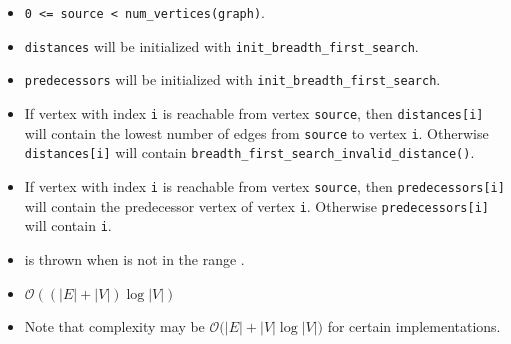 {\small
      
}

\begin{itemdescr}
\preconditions
            \begin{itemize}
                  \item
                        \lstinline{0 <= source < num_vertices(graph)}. 
                  \item
                        \lstinline{distances} will be initialized with \lstinline{init_breadth_first_search}.
                  \item
                        \lstinline{predecessors} will be initialized with \lstinline{init_breadth_first_search}.
            \end{itemize}
      \pnum\effects
            \begin{itemize}
                  \item
                        If vertex with index \lstinline{i} is reachable from vertex \lstinline{source}, then
                        \lstinline{distances[i]} will contain the lowest number of edges from \lstinline{source} to vertex
                        \lstinline{i}.  Otherwise \lstinline{distances[i]} will contain
                        \lstinline{breadth_first_search_invalid_distance()}.
                  \item
                        If vertex with index \lstinline{i} is reachable
                        from vertex \lstinline{source}, then \lstinline{predecessors[i]} will contain the
                        predecessor vertex of vertex \lstinline{i}. Otherwise \lstinline{predecessors[i]} will contain
                        \lstinline{i}.
            \end{itemize}
      \pnum\throws
            \begin{itemize}
                  \item {} is thrown when  is not in the range .
            \end{itemize}
      \pnum\complexity
            \begin{itemize}
                  \item $\mathcal{O}((|E| + |V|)\log{|V|})$
                  \item Note that complexity may be $\mathcal{O}(|E| + |V|\log{|V|)}$ for certain implementations. 
            \end{itemize}
\end{itemdescr}

